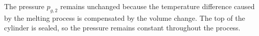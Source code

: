 The pressure \( p_{g,2} \) remains unchanged because the temperature difference caused by the melting process is compensated by the volume change. The top of the cylinder is sealed, so the pressure remains constant throughout the process.